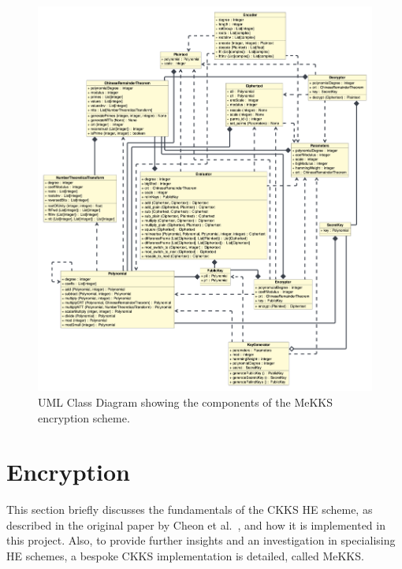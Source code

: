 \begin{figure}[htp]
    \centering
    \includegraphics[scale=0.19]{figures/mekksClasses}
    \captionsetup{justification=centering}
    \caption[MeKKS UML Class Diagram]{UML Class Diagram showing the components of the MeKKS encryption scheme.}
    \label{fig:mekksUML}
\end{figure}

\setlength{\leftskip}{0cm}





\section{Encryption}
\setlength{\leftskip}{0.25cm}
\indent \indent
This section briefly discusses the fundamentals of the CKKS HE scheme, as described in the original paper by Cheon et al.\ \cite{CKKS}, and how it is implemented in this project.  Also, to provide further insights and an investigation in specialising HE schemes, a bespoke CKKS implementation is detailed, called MeKKS. 

\setlength{\leftskip}{0cm}
